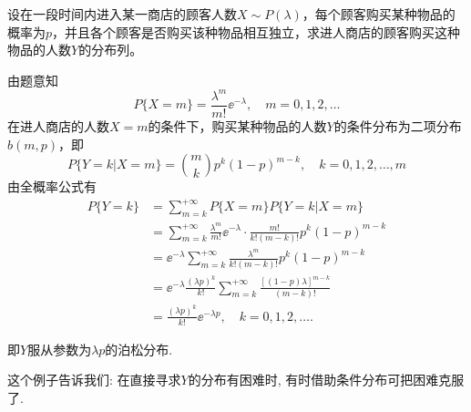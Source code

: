 \begin{example}
    设在一段时间内进入某一商店的顾客人数$X \sim P(\lambda)$，每个顾客购买某种物品的概率为$p$，并且各个顾客是否购买该种物品相互独立，求进人商店的顾客购买这种物品的人数$Y$的分布列。
\end{example}
\begin{solution}
    由题意知
    \[ P\{X=m\}=\frac{\lambda^m}{m!} \ee^{-\lambda}, \quad m=0,1,2, \dots \]
    在进人商店的人数$X=m$的条件下，购买某种物品的人数$Y$的条件分布为二项分布$b(m,p)$，即
    \[ P\{ Y=k | X=m \}=\binom{m}{k}p^k(1-p)^{m-k}, \quad k=0,1,2, \dots, m \]
    由全概率公式有
    \begin{align*}
        P\{Y=k\} & =\sum_{m=k}^{+\infty} P\{X=m\}P\{Y=k | X=m\}                                                       \\
                 & =\sum_{m=k}^{+\infty} \frac{\lambda^m}{m!} \ee^{-\lambda} \cdot \frac{m!}{k!(m-k)!} p^k(1-p)^{m-k} \\
                 & =\ee^{-\lambda} \sum_{m=k}^{+\infty} \frac{\lambda^m}{k!(m-k)!} p^k(1-p)^{m-k}                     \\
                 & =\ee^{-\lambda} \frac{(\lambda p)^k}{k!} \sum_{m=k}^{+\infty} \frac{[(1-p) \lambda]^{m-k}}{(m-k)!} \\
                 & =\frac{(\lambda p)^k}{k!} \ee^{-\lambda p}, \quad k=0,1,2, \dots.
    \end{align*}
\end{solution}
即$Y$服从参数为$\lambda p$的泊松分布.

这个例子告诉我们: 在直接寻求$Y$的分布有困难时, 有时借助条件分布可把困难克服了.

